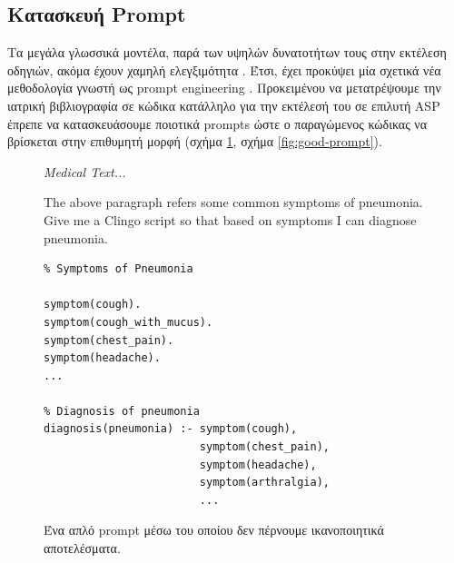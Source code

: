 \documentclass[12pt]{extarticle}
\begin{document}
\subsection{Κατασκευή Prompt}

Τα μεγάλα γλωσσικά μοντέλα, παρά των υψηλών δυνατοτήτων τους στην εκτέλεση οδηγιών, ακόμα 
έχουν χαμηλή ελεγξιμότητα \cite{bowman2023things}.
Έτσι, έχει προκύψει μία σχετικά νέα μεθοδολογία  γνωστή ως prompt engineering \cite{liu2021pretrain, promptingguidePromptEngineering}.
Προκειμένου να μετατρέψουμε την ιατρική βιβλιογραφία σε κώδικα
κατάλληλο για την εκτέλεσή του σε επιλυτή ASP έπρεπε να κατασκευάσουμε 
ποιοτικά prompts ώστε ο παραγώμενος κώδικας να βρίσκεται στην επιθυμητή μορφή (σχήμα \ref{fig:bad-prompt}, σχήμα \ref{fig:good-prompt}).

\begin{figure}[!h]
\centering
\begin{prompt}
\textit{Medical Text...}

The above paragraph refers some common symptoms of pneumonia.
Give me a Clingo script so that based on symptoms I can diagnose pneumonia.
\end{prompt}


\begin{commandline}
\begin{verbatim}
% Symptoms of Pneumonia

symptom(cough).
symptom(cough_with_mucus).
symptom(chest_pain).
symptom(headache).
...

% Diagnosis of pneumonia
diagnosis(pneumonia) :- symptom(cough), 
                        symptom(chest_pain), 
                        symptom(headache), 
                        symptom(arthralgia),
                        ...
\end{verbatim}
\end{commandline}

\caption{Ένα απλό prompt μέσω του οποίου δεν πέρνουμε ικανοποιητικά αποτελέσματα.}
\label{fig:bad-prompt}
\end{figure}
\end{document}
